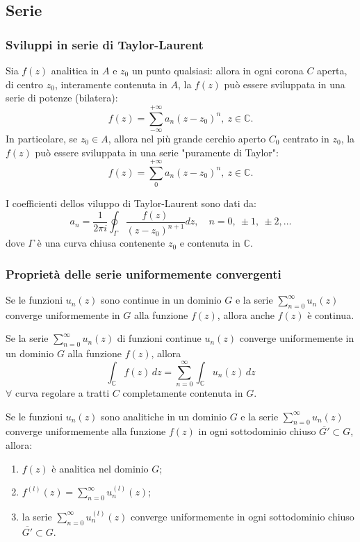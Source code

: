 \subsection*{Serie}
\subsubsection*{Sviluppi in serie di Taylor-Laurent}
\begin{theorem}
    Sia $f(z)$ analitica in $A$ e $z_0$ un punto qualsiasi: allora in ogni corona $C$ aperta, di centro $z_0$, interamente contenuta in $A$, la $f(z)$ può essere sviluppata in una serie di potenze (bilatera):
    \[
        f(z) = \sum_{-\infty}^{+\infty}a_n(z-z_0)^n,\  z\in\mathbb{C}.
    \]
    In particolare, se $z_0\in A$, allora nel più grande cerchio aperto $C_0$ centrato in $z_0$, la $f(z)$ può essere sviluppata in una serie "puramente di Taylor":
    \[
        f(z) = \sum_{0}^{+\infty}a_n(z-z_0)^n,\  z\in\mathbb{C}.
    \]
\end{theorem}
I coefficienti dellos viluppo di Taylor-Laurent sono dati da:
\[
    a_n=\frac{1}{2\pi i}\oint_{\Gamma}\frac{f(z)}{(z-z_0)^{n+1}}dz,\quad n=0,\ \pm1,\ \pm2, \dots
\]
dove $\Gamma$ è una curva chiusa contenente $z_0$ e contenuta in $\mathbb{C}$.
\subsubsection*{Proprietà delle serie uniformemente convergenti}
\begin{theorem}
    Se le funzioni $u_n(z)$ sono continue in un dominio $G$ e la serie $\displaystyle \sum_{n=0}^\infty u_n(z)$ converge uniformemente in $G$ alla funzione $f(z)$, allora anche $f(z)$ è continua.
\end{theorem}
\begin{theorem}
    Se la serie $\displaystyle \sum_{n=0}^\infty u_n(z)$ di funzioni continue $u_n(z)$ converge uniformemente in un dominio $G$ alla funzione $f(z)$, allora
    \[
        \int_\mathbb{C}f(z)\,dz=\displaystyle \sum_{n=0}^\infty \int_\mathbb{C}u_n(z)\,dz
    \]
    $\forall$ curva regolare a tratti $C$ completamente contenuta in $G$.
\end{theorem}
\begin{theorem}[di Weierstrass]
    Se le funzioni $u_n(z)$ sono analitiche in un dominio $G$ e la serie $\displaystyle \sum_{n=0}^\infty u_n(z)$ converge uniformemente alla funzione $f(z)$ in ogni sottodominio chiuso $\overline{G'}\subset G$, allora:
    \begin{enumerate}
        \item $f(z)$ è analitica nel dominio $G$;
        \item $f^{(l)}(z)=\displaystyle \sum_{n=0}^\infty u_n^{(l)}(z)$;
        \item la serie $\displaystyle \sum_{n=0}^\infty u_n^{(l)}(z)$ converge uniformemente in ogni sottodominio chiuso $\overline{G'}\subset G$.
    \end{enumerate}
\end{theorem}

